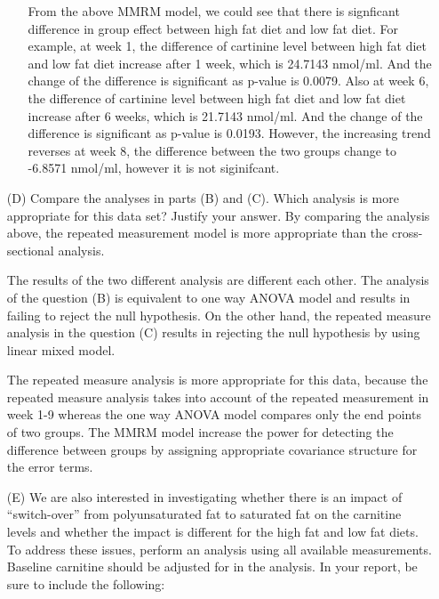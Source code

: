 \begin{itemize}
\begin{itemize}
From the above MMRM model, we could see that there is signficant difference in group effect between high fat diet and low fat diet. For example, at week 1, the difference of cartinine level between high fat diet and low fat diet increase after 1 week, which is 24.7143 nmol/ml. And the change of the difference is significant as p-value is 0.0079. Also at week 6, the difference of cartinine level between high fat diet and low fat diet increase after 6 weeks, which is 21.7143 nmol/ml. And the change of the difference is significant as p-value is 0.0193. However, the increasing trend reverses at week 8, the difference between the two groups change to -6.8571 nmol/ml, however it is not siginifcant. 

	
											   \end{itemize}						
							
							
								\vspace{0.2cm}
								\item[(D)] Compare the analyses in parts (B) and (C). Which analysis is more appropriate for this data set? Justify your answer.				
By comparing the analysis above, the repeated measurement model is more appropriate than the cross-sectional analysis. 
		
The results of the two different analysis are different each other. The analysis of the question (B) is equivalent to one way ANOVA model and results in failing to reject the null hypothesis. On the other hand, the repeated measure analysis in the question (C) results in rejecting the null hypothesis by using linear mixed model.

The repeated measure analysis is more appropriate for this data, because the repeated measure analysis takes into account of the repeated measurement in week 1-9 whereas the one way ANOVA model compares only the end points of two groups. The MMRM model increase the power for detecting the difference between groups by assigning appropriate covariance structure for the error terms. 
							
								\vspace{0.2cm}
								\item[(E)] We are also interested in investigating whether there is an impact of ``switch-over'' from polyunsaturated fat 
													 to saturated fat on the carnitine levels and whether the impact is different for the high fat and low fat diets. 
													 To address these issues, perform an analysis using all available measurements. Baseline carnitine should be 
													 adjusted for in the analysis. In your report, be sure to include the following:
							

\end{itemize}
